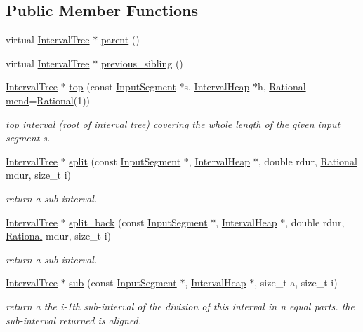 \subsection*{Public Member Functions}
\begin{DoxyCompactItemize}
\item 
virtual \mbox{\hyperlink{classIntervalTree}{Interval\+Tree}} $\ast$ \mbox{\hyperlink{classIntervalTree_a68c95f629571e4d24caa9dfc669a4412}{parent}} ()
\item 
virtual \mbox{\hyperlink{classIntervalTree}{Interval\+Tree}} $\ast$ \mbox{\hyperlink{classIntervalTree_a0b640dcd2f3e26d31a1d4d7b3fd305ed}{previous\+\_\+sibling}} ()
\item 
\mbox{\hyperlink{classIntervalTree}{Interval\+Tree}} $\ast$ \mbox{\hyperlink{group__segment_ga0c04840a0d05d3b0d4b99e654d72b81b}{top}} (const \mbox{\hyperlink{classInputSegment}{Input\+Segment}} $\ast$s, \mbox{\hyperlink{classIntervalHeap}{Interval\+Heap}} $\ast$h, \mbox{\hyperlink{classRational}{Rational}} \mbox{\hyperlink{classInterval_a963b9b36f085a7db9c159c55608f8408}{mend}}=\mbox{\hyperlink{classRational}{Rational}}(1))
\begin{DoxyCompactList}\small\item\em top interval (root of interval tree) covering the whole length of the given input segment s. \end{DoxyCompactList}\item 
\mbox{\hyperlink{classIntervalTree}{Interval\+Tree}} $\ast$ \mbox{\hyperlink{group__segment_gae9e8f6ca3fa4093cfcd1428e9f41d048}{split}} (const \mbox{\hyperlink{classInputSegment}{Input\+Segment}} $\ast$, \mbox{\hyperlink{classIntervalHeap}{Interval\+Heap}} $\ast$, double rdur, \mbox{\hyperlink{classRational}{Rational}} mdur, size\+\_\+t i)
\begin{DoxyCompactList}\small\item\em return a sub interval. \end{DoxyCompactList}\item 
\mbox{\hyperlink{classIntervalTree}{Interval\+Tree}} $\ast$ \mbox{\hyperlink{group__segment_ga5b1393db865d0dd81249033dd99ecd5c}{split\+\_\+back}} (const \mbox{\hyperlink{classInputSegment}{Input\+Segment}} $\ast$, \mbox{\hyperlink{classIntervalHeap}{Interval\+Heap}} $\ast$, double rdur, \mbox{\hyperlink{classRational}{Rational}} mdur, size\+\_\+t i)
\begin{DoxyCompactList}\small\item\em return a sub interval. \end{DoxyCompactList}\item 
\mbox{\hyperlink{classIntervalTree}{Interval\+Tree}} $\ast$ \mbox{\hyperlink{group__segment_gacb8de7e3756951950c391d241adec21c}{sub}} (const \mbox{\hyperlink{classInputSegment}{Input\+Segment}} $\ast$, \mbox{\hyperlink{classIntervalHeap}{Interval\+Heap}} $\ast$, size\+\_\+t a, size\+\_\+t i)
\begin{DoxyCompactList}\small\item\em return a the i-\/1th sub-\/interval of the division of this interval in n equal parts. the sub-\/interval returned is aligned. \end{DoxyCompactList}\end{DoxyCompactItemize}
